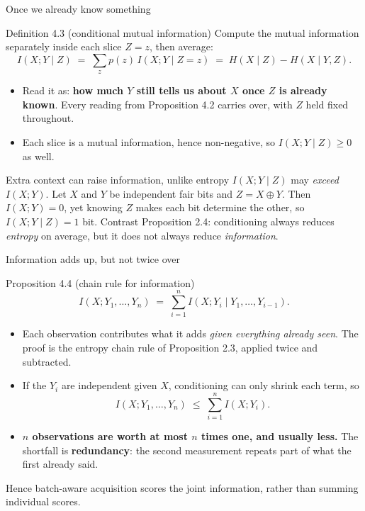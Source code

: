 \documentclass[aspectratio=169,9pt]{beamer}
\newcommand{\orange}[1]{\textcolor{AmazonOrange}{\textbf{#1}}}
\newcommand{\blue}[1]{\textcolor{densityblue}{\textbf{#1}}}
\newcommand{\muted}[1]{\textcolor{EPICMuted}{#1}}
\begin{document}
\begin{frame}{Once we already know something}
\begin{block}{Definition 4.3 (conditional mutual information)}
Compute the mutual information separately inside each slice $Z = z$, then average:
\vspace{-0.1cm}
\[
    I(X;Y \mid Z) \;=\; \sum_z p(z)\, I(X;Y \mid Z = z)
                  \;=\; H(X \mid Z) - H(X \mid Y, Z).
\]
\end{block}
\pause
\vspace{0.05cm}
\begin{itemize}
    \item Read it as: \blue{how much $Y$ still tells us about $X$ once $Z$ is already known}. Every reading
    from Proposition 4.2 carries over, with $Z$ held fixed throughout.
    \pause
    \item Each slice is a mutual information, hence non-negative, so $I(X;Y \mid Z) \ge 0$ as well.
\end{itemize}
\vspace{0.0cm}
\pause
\begin{alertblock}{Extra context can raise information, unlike entropy}
$I(X;Y \mid Z)$ may \textit{exceed} $I(X;Y)$. Let $X$ and $Y$ be independent fair bits and $Z = X \oplus Y$.
Then $I(X;Y) = 0$, yet knowing $Z$ makes each bit determine the other, so $I(X;Y \mid Z) = 1$ bit. Contrast
Proposition 2.4: conditioning always reduces \textit{entropy} on average, but it does not always reduce
\textit{information}.
\end{alertblock}
\end{frame}

\begin{frame}{Information adds up, but not twice over}
\begin{block}{Proposition 4.4 (chain rule for information)}
\[
    I(X; Y_1,\dots,Y_n) \;=\; \sum_{i=1}^n I(X; Y_i \mid Y_1, \dots, Y_{i-1}).
\]
\end{block}
\pause
\vspace{0.1cm}
\begin{itemize}
    \item Each observation contributes what it adds \textit{given everything already seen}. The proof is the
    entropy chain rule of Proposition 2.3, applied twice and subtracted.
    \pause
    \item If the $Y_i$ are independent given $X$, conditioning can only shrink each term, so
    \[
        I(X; Y_1,\dots,Y_n) \;\le\; \sum_{i=1}^n I(X; Y_i).
    \]
    \pause
    \item \orange{$n$ observations are worth at most $n$ times one, and usually less.} The shortfall is
    \blue{redundancy}: the second measurement repeats part of what the first already said.
\end{itemize}
\vspace{0.1cm}
\pause
\muted{Hence batch-aware acquisition scores the joint information, rather than summing individual scores.}
\end{frame}
\end{document}
